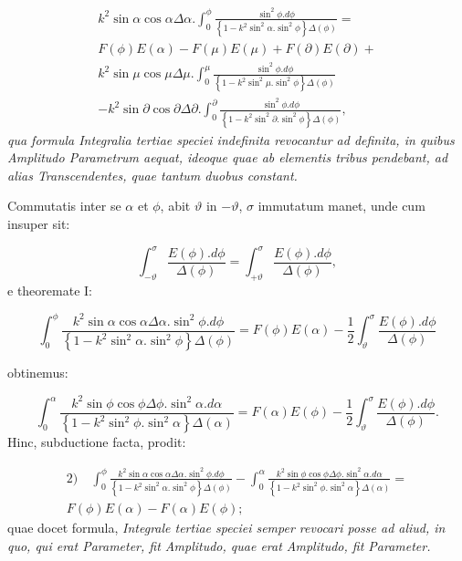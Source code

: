 \documentclass{article}
\begin{document}
\[
\begin{gathered}
k^{2}\sin\alpha\cos\alpha\Delta\alpha.\int_{0}^{\phi}\frac{\sin^{2}\phi.d\phi}{\left\{1-k^{2}\sin^{2}\alpha.\sin^{2}\phi\right\}\Delta(\phi)}=\\[1.5ex]
F(\phi)E(\alpha)-F(\mu)E(\mu)+F(\partial)E(\partial)+\\[1.5ex]
k^{2}\sin\mu\cos\mu\Delta\mu.\int_{0}^{\mu}\frac{\sin^{2}\phi.d\phi}{\left\{1-k^{2}\sin^{2}\mu.\sin^{2}\phi\right\}\Delta(\phi)}\\[1.5ex]
-k^{2}\sin\partial\cos\partial\Delta\partial.\int_{0}^{\partial}\frac{\sin^{2}\phi.d\phi}{\left\{1-k^{2}\sin^{2}\partial.\sin^{2}\phi\right\}\Delta(\phi)},
\end{gathered}
\]
\emph{qua formula Integralia tertiae speciei indefinita revocantur ad definita, in quibus Amplitudo Parametrum aequat, ideoque quae ab elementis tribus pendebant, ad alias Transcendentes, quae tantum duobus constant.}

Commutatis inter se $\alpha$ et $\phi$, abit $\vartheta$ in $-\vartheta$, $\sigma$ immutatum manet, unde cum insuper sit:

\[
\int_{-\vartheta}^{\sigma}\frac{E(\phi).d\phi}{\Delta(\phi)}=\int_{+\vartheta}^{\sigma}\frac{E(\phi).d\phi}{\Delta(\phi)},
\]
e theoremate I:

\[
\int_{0}^{\phi}\frac{k^{2}\sin\alpha\cos\alpha\Delta\alpha.\sin^{2}\phi.d\phi}{\left\{1-k^{2}\sin^{2}\alpha.\sin^{2}\phi\right\}\Delta(\phi)}=F(\phi)E(\alpha)-\frac{1}{2}\int_{\vartheta}^{\sigma}\frac{E(\phi).d\phi}{\Delta(\phi)}
\]

obtinemus:

\[
\int_{0}^{\alpha}\frac{k^{2}\sin\phi\cos\phi\Delta\phi.\sin^{2}\alpha.d\alpha}{\left\{1-k^{2}\sin^{2}\phi.\sin^{2}\alpha\right\}\Delta(\alpha)}=F(\alpha)E(\phi)-\frac{1}{2}\int_{\vartheta}^{\sigma}\frac{E(\phi).d\phi}{\Delta(\phi)}.
\]
Hinc, subductione facta, prodit:

\[
\begin{gathered}
\text{2)}\quad\int_{0}^{\phi}\frac{k^{2}\sin\alpha\cos\alpha\Delta\alpha.\sin^{2}\phi.d\phi}{\left\{1-k^{2}\sin^{2}\alpha.\sin^{2}\phi\right\}\Delta(\phi)}-\int_{0}^{\alpha}\frac{k^{2}\sin\phi\cos\phi\Delta\phi.\sin^{2}\alpha.d\alpha}{\left\{1-k^{2}\sin^{2}\phi.\sin^{2}\alpha\right\}\Delta(\alpha)}=\\[1.5ex]
F(\phi)E(\alpha)-F(\alpha)E(\phi);
\end{gathered}
\]
quae docet formula, \emph{Integrale tertiae speciei semper revocari posse ad aliud, in quo, qui erat Parameter, fit Amplitudo, quae erat Amplitudo, fit Parameter.}
\end{document}

